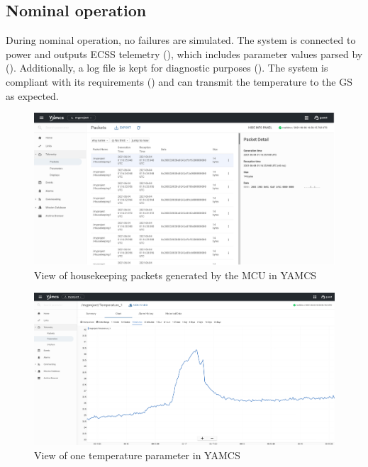 \documentclass[a4paper,nobib]{tufte-book}
\begin{document}
\subsection{Nominal operation}

During nominal operation, no failures are simulated. The system is connected to power and outputs \acs{ECSS} telemetry (), which includes parameter values parsed by (). Additionally, a log file is kept for diagnostic purposes (). The system is compliant with its requirements () and can transmit the temperature to the \acl{GS} as expected.

\begin{figure}
	\centering
	\includegraphics{media/screenshots/yamcs_housekeeping}
	\caption{View of housekeeping packets generated by the \acs{MCU} in \acs{YAMCS}}
	\label{fig:yamcshousekeeping}
\end{figure}

\begin{figure}[h]
	\centering
	\includegraphics{media/screenshots/yamcs_parameter}
	\caption{View of one temperature parameter in \acs{YAMCS}}
	\label{fig:yamcsparameter}
\end{figure}
\end{document}
